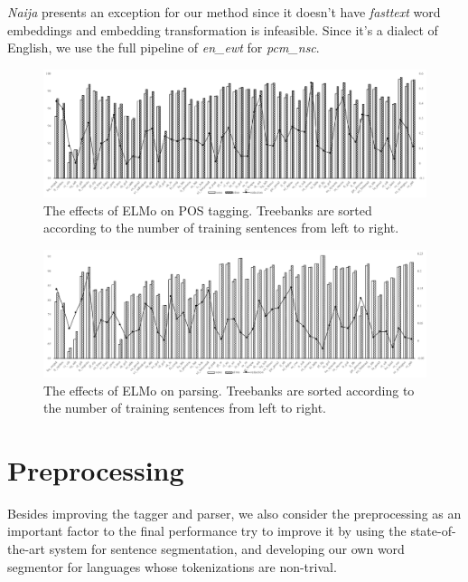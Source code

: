 \documentclass[11pt,a4paper]{article}
\begin{document}
\textit{Naija} presents an exception for our method since it doesn't have \textit{fasttext}
word embeddings and embedding transformation is infeasible.
Since it's a dialect of English, we use the full pipeline of \textit{en\_ewt} for \textit{pcm\_nsc}.
\begin{figure}[t]
	\includegraphics[width=\textwidth]{effects_elmo_tagger}
	\caption{The effects of ELMo on POS tagging.
		Treebanks are sorted according to the number of training sentences from left to right.}\label{fig:elmo-effect-pos}
\end{figure}
\begin{figure}[t]
	\includegraphics[width=\textwidth]{effects_elmo_parser}
	\caption{The effects of ELMo on parsing.
		Treebanks are sorted according to the number of training sentences from left to right.}\label{fig:elmo-effect-par}
\end{figure}

\section{Preprocessing}
Besides improving the tagger and parser,
we also consider the preprocessing as an important factor to
the final performance try to improve it
by using the state-of-the-art system for sentence segmentation,
and developing our own word segmentor for languages
whose tokenizations are non-trival.
\end{document}
